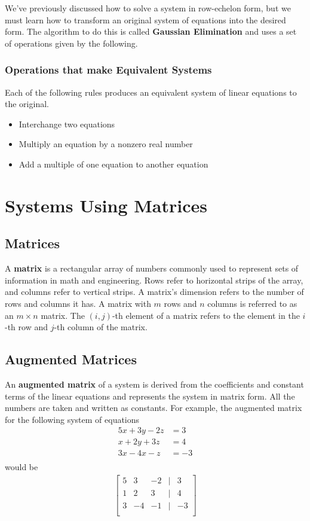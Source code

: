 \documentclass[11pt]{article}
\begin{document}
We've previously discussed how to solve a system in row-echelon form, but we must learn how to transform an original system of equations into the desired form. The algorithm to do this is called \textbf{Gaussian Elimination} and uses a set of operations given by the following.

\subsubsection*{Operations that make Equivalent Systems}
Each of the following rules produces an equivalent system of linear equations to the original.
\begin{itemize}
    \item Interchange two equations
    \item Multiply an equation by a nonzero real number
    \item Add a multiple of one equation to another equation
\end{itemize}

\section{Systems Using Matrices}

\subsection{Matrices}
A \textbf{matrix} is a rectangular array of numbers commonly used to represent sets of information in math and engineering. Rows refer to horizontal strips of the array, and columns refer to vertical strips. A matrix's dimension refers to the number of rows and columns it has. A matrix with $m$ rows and $n$ columns is referred to as an $m \times n$ matrix. The $(i, j)$-th element of a matrix refers to the element in the $i$-th row and $j$-th column of the matrix.

\subsection{Augmented Matrices}
An \textbf{augmented matrix} of a system is derived from the coefficients and constant terms of the linear equations and represents the system in matrix form. All the numbers are taken and written as constants. For example, the augmented matrix for the following system of equations
\begin{align*}
    5x + 3y -2z &= 3 \\
    x + 2y + 3z &= 4 \\
    3x -4x - z &= -3 \\
\end{align*}
would be
\begin{align*}
    \begin{bmatrix}
        5 & 3 & -2 & | & 3 \\
        1 & 2 & 3 & | & 4\\
        3 & -4 & -1 & | & -3 \\
    \end{bmatrix}
\end{align*}
\end{document}
